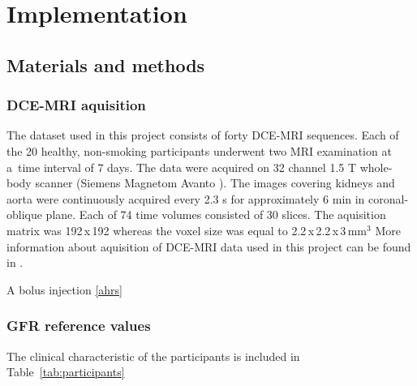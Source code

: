 \chapter{Implementation}

\section{Materials and methods}
\subsection{DCE-MRI aquisition}
The dataset used in this project consists of forty DCE-MRI sequences. Each of the 20 healthy, non-smoking participants underwent two MRI examination at a~time interval of 7 days.
The data were acquired on 32 channel 1.5 T whole-body scanner (Siemens Magnetom Avanto \cite{simens}).
The  images covering kidneys and aorta were continuously acquired every 2.3 s for approximately 6 min in coronal-oblique plane.
Each of 74 time volumes consisted of 30 slices.
The aquisition matrix was 192\,x\,192 whereas the voxel size was equal to 2.2\,x\,2.2\,x\,3\,mm$^3$
More information about aquisition of DCE-MRI data used in this project can be found in \cite{eikefjord2017dynamic}.

A bolus injection \ref{ahrs}

\subsection{GFR reference values}

The clinical characteristic of the participants is included in Table~\ref{tab:participants}



